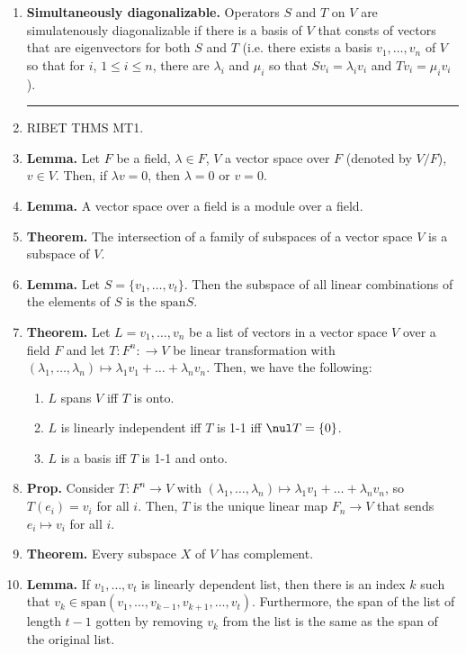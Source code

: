 \begin{enumerate}
	\item \textbf{Simultaneously diagonalizable. } Operators $S$ and $T$ on $V$ are simulatenously diagonalizable if there is a basis of $V$ that consts of vectors that are eigenvectors for both $S$ and $T$ (i.e. there exists a basis $v_1,\dots,v_n$ of $V$ so that for $i$, $1 \leq i \leq n$, there are $\lambda_i$ and $\mu_i$ so that $Sv_i = \lambda_iv_i$ and $Tv_i = \mu_iv_i$). 
	\begin{center}
		\hrule
	\end{center} 
	\item RIBET THMS MT1. 
	\item \textbf{Lemma. } Let $F$ be a field, $\lambda \in F$, $V$ a vector space over $F$ (denoted by $V/F$), $v \in V$. Then, if $\lambda v = 0$, then $\lambda=0$ or $v=0$. 
    \item \textbf{Lemma. } A vector space over a field is a module over a field. 
    \item \textbf{Theorem. } The intersection of a family of subspaces of a vector space $V$ is a subspace of $V$. 
    \item \textbf{Lemma. } Let $S=\{v_1,\dots,v_t\}$. Then the subspace of all linear combinations of the elements of $S$ is the $\mathrm{span}S$. 
    \item \textbf{Theorem. } Let $L=v_1,\dots,v_n$ be a list of vectors in a vector space $V$ over a field $F$ and let $T: F^n: \to V$ be linear transformation with $(\lambda_1,\dots,\lambda_n) \mapsto \lambda_1v_1 + \dots + \lambda_nv_n$. Then, we have the following: 
    \begin{enumerate}
        \item $L$ spans $V$ iff $T$ is onto. 
        \item $L$ is linearly independent iff $T$ is 1-1 iff $\nul T = \{0\}$. 
        \item $L$ is a basis iff $T$ is 1-1 and onto. 
    \end{enumerate}
    \item \textbf{Prop. } Consider $T: F^n \to V$ with $(\lambda_1,\dots,\lambda_n) \mapsto \lambda_1v_1 + \dots + \lambda_nv_n$, so $T(e_i)=v_i$ for all $i$. Then, $T$ is the unique linear map $F_n \to V$ that sends $e_i \mapsto v_i$ for all $i$. 
    \item \textbf{Theorem. } Every subspace $X$ of $V$ has complement. 
	\item \textbf{Lemma. } If $v_1,\dots,v_t$ is linearly dependent list, then there is an index $k$ such that $v_k \in \textrm{span}(v_1,\dots,v_{k-1},v_{k+1},\dots,v_t)$. Furthermore, the span of the list of length $t-1$ gotten by removing $v_k$ from the list is the same as the span of the original list. 

\end{enumerate}
